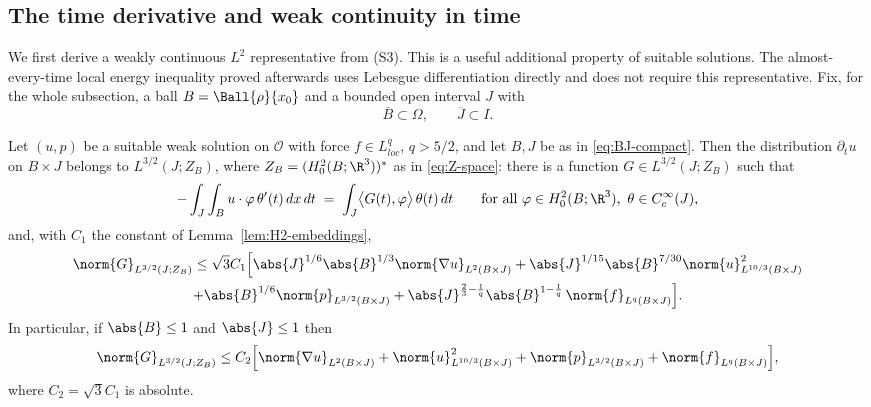 \documentclass[11pt,reqno]{amsart}
\begin{document}
\subsection{The time derivative and weak continuity in time}\label{ss:time}

We first derive a weakly continuous $L^{2}$ representative from (S3). This
is a useful additional property of suitable solutions. The almost-every-time
local energy inequality proved afterwards uses Lebesgue differentiation
directly and does not require this representative. Fix, for the whole
subsection, a ball $B=\Ball{\rho}{x_{0}}$ and a
bounded open interval $J$ with
\begin{equation}\label{eq:BJ-compact}
  \overline{B}\subset\Omega,\qquad \overline{J}\subset I .
\end{equation}

\begin{lemma}\label{lem:dtu-dual}
Let $(u,p)$ be a suitable weak solution on $\mathcal{O}$ with force
$f\in L^{q}_{loc}$, $q>5/2$, and let $B,J$ be as in \eqref{eq:BJ-compact}. Then
the distribution $\partial_{t}u$ on $B\times J$ belongs to
$L^{3/2}(J;Z_{B})$, where $Z_{B}=(H^{2}_{0}(B;\R^{3}))^{*}$ as in
\eqref{eq:Z-space}: there is a function
$G\in L^{3/2}(J;Z_{B})$ such that
\begin{equation}\label{eq:dtu-weak}
  -\int_{J}\int_{B}u\cdot\varphi\,\theta'(t)\,dx\,dt
  \;=\;\int_{J}\bigl\langle G(t),\varphi\bigr\rangle\,\theta(t)\,dt
  \qquad
  \text{for all }\varphi\in H^{2}_{0}(B;\R^{3}),\ \theta\in C_{c}^{\infty}(J),
\end{equation}
and, with $C_{1}$ the constant of Lemma~\ref{lem:H2-embeddings},
\begin{multline}\label{eq:dtu-bound}
  \norm{G}_{L^{3/2}(J;Z_{B})}
  \le\sqrt{3}C_{1}\Bigl[
      \abs{J}^{1/6}\abs{B}^{1/3}\norm{\nabla u}_{L^{2}(B\times J)}
      +\abs{J}^{1/15}\abs{B}^{7/30}\norm{u}_{L^{10/3}(B\times J)}^{2}\\
      +\abs{B}^{1/6}\norm{p}_{L^{3/2}(B\times J)}
      +\abs{J}^{\frac23-\frac1q}\abs{B}^{1-\frac1q}\,\norm{f}_{L^{q}(B\times J)}
     \Bigr].
\end{multline}
In particular, if $\abs{B}\le1$ and $\abs{J}\le1$ then
\begin{equation}\label{eq:dtu-bound-simple}
  \norm{G}_{L^{3/2}(J;Z_{B})}
  \le C_{2}\Bigl[\norm{\nabla u}_{L^{2}(B\times J)}
    +\norm{u}_{L^{10/3}(B\times J)}^{2}
    +\norm{p}_{L^{3/2}(B\times J)}
    +\norm{f}_{L^{q}(B\times J)}\Bigr],
\end{equation}
where $C_{2}=\sqrt{3}C_{1}$ is absolute.
\end{lemma}
\end{document}
